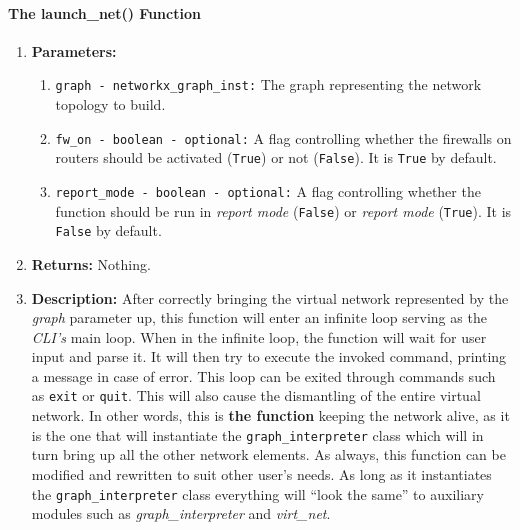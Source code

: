     \paragraph{The launch\_net() Function}
        \begin{enumerate}
            \item \textbf{Parameters:}
            \begin{enumerate}
                \item \texttt{graph - networkx\_graph\_inst:} The graph representing the network topology to build.
                \item \texttt{fw\_on - boolean - optional:} A flag controlling whether the firewalls on routers should be activated (\texttt{True}) or not (\texttt{False}). It is \texttt{True} by default.
                \item \texttt{report\_mode - boolean - optional:} A flag controlling whether the function should be run in \textit{report mode} (\texttt{False}) or \textit{report mode} (\texttt{True}). It is \texttt{False} by default.
            \end{enumerate}
            \item \textbf{Returns:} Nothing.
            \item \textbf{Description:} After correctly bringing the virtual network represented by the \textit{graph} parameter up, this function will enter an infinite loop serving as the \textit{CLI's} main loop. When in the infinite loop, the function will wait for user input and parse it. It will then try to execute the invoked command, printing a message in case of error. This loop can be exited through commands such as \texttt{exit} or \texttt{quit}. This will also cause the dismantling of the entire virtual network. In other words, this is \textbf{the function} keeping the network alive, as it is the one that will instantiate the \texttt{graph\_interpreter} class which will in turn bring up all the other network elements. As always, this function can be modified and rewritten to suit other user's needs. As long as it instantiates the \texttt{graph\_interpreter} class everything will ``look the same'' to auxiliary modules such as \textit{graph\_interpreter} and \textit{virt\_net}.
        \end{enumerate}
